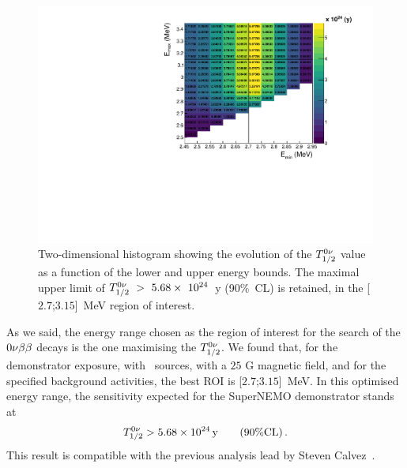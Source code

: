 \begin{figure}[h]
  \centering
  \includegraphics[width=1.1\textwidth]{Sensitivity/fig_sensitivity/sensitivity_spectrum_with_B_82Se.pdf}
  \caption{Two-dimensional histogram showing the evolution of the $T_{1/2}^{0\nu}$ value as a function of the lower and upper energy bounds.
    The maximal upper limit of $T_{1/2}^{0\nu}~>~5.68\times~10^{24}$~y (90\%~CL) is retained, in the [$2.7$;$3.15$]~MeV region of interest.
    \label{fig:sensitivity_cont}}
\end{figure}
As we said, the energy range chosen as the region of interest for the search of the $0\nu\beta\beta$ decays is the one maximising the $T_{1/2}^{0\nu}$.
We found that, for the demonstrator exposure, with \Se\ sources, with a $25$ G magnetic field, and for the specified background activities, the best ROI is [$2.7$;$3.15$]~MeV.
In this optimised energy range, the sensitivity expected for the SuperNEMO demonstrator stands at
\begin{equation}
T_{1/2}^{0\nu} > 5.68\times 10^{24}\,\text{y}\qquad (90\% \text{CL})\,.
\end{equation}
This result is compatible with the previous analysis lead by Steven Calvez~\cite{CalvezThesis}.


